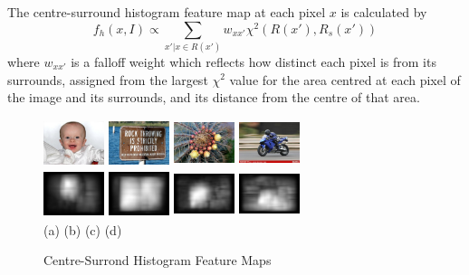 \documentclass[10pt,twocolumn,letterpaper]{article}
\newcommand{\SUM}{\sum\limits}
\newcommand{\hs}{\hspace{0.58in}}
\begin{document}
The centre-surround histogram feature map at each pixel $x$ is calculated by$$f_h(x,I)\propto\SUM_{x'|x\in R(x')}w_{xx'}\chi^2(R(x'),R_s(x'))$$where $w_{xx'}$ is a falloff weight which reflects how distinct each pixel is from its surrounds, assigned from the largest $\chi^2$ value for the area centred at each pixel of the image and its surrounds, and its distance from the centre of that area. 

\begin{figure}[b]
    \begin{center}
    \includegraphics[width=0.7in,height=0.54in]{./Figures/CSH_image/1orig.jpg}
    \includegraphics[width=0.7in,height=0.54in]{./Figures/CSH_image/2orig.jpg}
    \includegraphics[width=0.7in,height=0.54in]{./Figures/CSH_image/3orig.jpg}
    \includegraphics[width=0.7in,height=0.54in]{./Figures/CSH_image/4orig.jpg}\\
    \includegraphics[width=0.7in,height=0.54in]{./Figures/CSH_image/1cont.jpg}
    \includegraphics[width=0.7in,height=0.54in]{./Figures/CSH_image/2cont.jpg}
    \includegraphics[width=0.7in,height=0.54in]{./Figures/CSH_image/3cont.jpg}
    \includegraphics[width=0.7in,height=0.54in]{./Figures/CSH_image/4cont.jpg}\\
    \footnotesize \hspace{0.1cm} (a) \hs (b) \hs  (c) \hs (d) \\
    \caption{Centre-Surrond Histogram Feature Maps} \label{Fig:RegionalFeatureMap}
    \end{center}
\end{figure}
\end{document}

